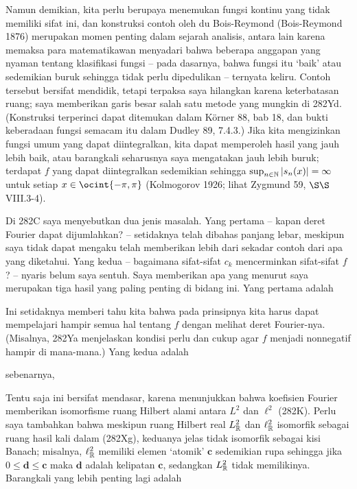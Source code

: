 {

\noindent Namun demikian, kita perlu berupaya menemukan fungsi
kontinu
yang tidak memiliki sifat ini, dan konstruksi contoh oleh du
Bois-Reymond ({\smc Bois-Reymond 1876}) merupakan momen penting dalam sejarah analisis, antara lain karena memaksa para matematikawan
menyadari bahwa beberapa anggapan yang nyaman tentang klasifikasi fungsi
-- pada dasarnya, bahwa fungsi
itu `baik' atau sedemikian buruk sehingga tidak perlu dipedulikan -- ternyata keliru.  Contoh tersebut
bersifat mendidik, tetapi terpaksa saya hilangkan karena keterbatasan ruang; saya memberikan garis besar
salah satu metode yang mungkin di 282Yd.   (Konstruksi terperinci dapat ditemukan
dalam {\smc K\"orner 88}, bab 18, dan bukti keberadaan fungsi
semacam itu dalam {\smc Dudley 89}, 7.4.3.) Jika kita mengizinkan fungsi umum
yang dapat diintegralkan, kita dapat memperoleh hasil yang jauh lebih baik, atau barangkali seharusnya saya
mengatakan jauh lebih buruk; terdapat $f$ yang dapat diintegralkan sedemikian sehingga $\sup_{n\in\Bbb
N}|s_n(x)|=\infty$ untuk setiap $x\in\ocint{-\pi,\pi}$
({\smc Kolmogorov 1926}; lihat {\smc Zygmund 59}, $\S\S$VIII.3-4).

Di 282C saya menyebutkan dua jenis masalah. Yang pertama -- kapan deret
Fourier
dapat dijumlahkan? -- setidaknya telah dibahas panjang lebar, meskipun saya
tidak dapat mengaku telah memberikan lebih dari sekadar contoh dari apa yang diketahui.
Yang kedua -- bagaimana sifat-sifat $c_k$ mencerminkan sifat-sifat $f$? -- nyaris belum saya sentuh.   Saya memberikan apa yang menurut saya merupakan tiga hasil
yang paling penting di bidang ini.   Yang pertama adalah


\noindent Ini setidaknya memberi tahu kita bahwa pada prinsipnya kita harus dapat
mempelajari hampir semua hal tentang $f$ dengan melihat deret Fourier-nya.
(Misalnya, 282Ya menjelaskan kondisi perlu dan cukup agar
$f$ menjadi nonnegatif hampir di mana-mana.) Yang kedua adalah


\noindent sebenarnya,


\noindent Tentu saja ini bersifat mendasar, karena menunjukkan bahwa koefisien
Fourier memberikan isomorfisme ruang Hilbert alami antara $L^2$
dan $\ell^2$ (282K). Perlu saya tambahkan bahwa meskipun ruang Hilbert real
$L^2_{\Bbb R}$ dan $\ell^2_{\Bbb R}$ isomorfik sebagai
ruang hasil kali dalam (282Xg), keduanya jelas tidak isomorfik sebagai kisi Banach;
misalnya, $\ell^2_{\Bbb R}$ memiliki elemen `atomik'
$\pmb{c}$ sedemikian rupa sehingga jika $0\le\pmb{d}\le\pmb{c}$ maka $\pmb{d}$ adalah
kelipatan $\pmb{c}$, sedangkan $L^2_{\Bbb R}$ tidak memilikinya.   Barangkali yang
lebih penting lagi adalah

}
